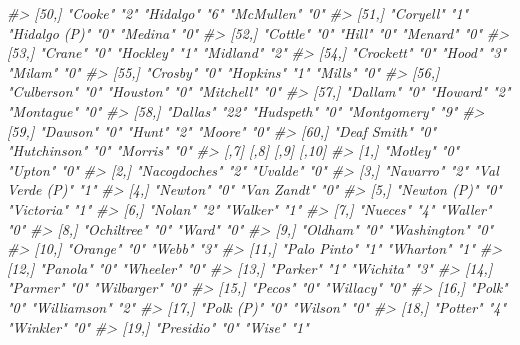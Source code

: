 \documentclass[
]{krantz}
\makeatletter
\newenvironment{Shaded}{\begin{snugshade}}{\end{snugshade}}
\newcommand{\CommentTok}[1]{\textcolor[rgb]{0.37,0.37,0.37}{\textit{#1}}}
\newenvironment{kframe}{%
\medskip{}
\setlength{\fboxsep}{.8em}
 \def\at@end@of@kframe{}%
 \ifinner\ifhmode%
  \def\at@end@of@kframe{\end{minipage}}%
  \begin{minipage}{\columnwidth}%
 \fi\fi%
 \def\FrameCommand##1{\hskip\@totalleftmargin \hskip-\fboxsep
 \colorbox{shadecolor}{##1}\hskip-\fboxsep
     \hskip-\linewidth \hskip-\@totalleftmargin \hskip\columnwidth}%
 \MakeFramed {\advance\hsize-\width
   \@totalleftmargin\z@ \linewidth\hsize
   \@setminipage}}%
 {\par\unskip\endMakeFramed%
 \at@end@of@kframe}
\renewenvironment{Shaded}{\begin{kframe}}{\end{kframe}}
\makeatother
\begin{document}
\begin{Shaded}
\begin{Highlighting}[]
\CommentTok{\#\textgreater{} [50,] "Cooke"         "2"  "Hidalgo"     "6"  "McMullen"      "0" }
\CommentTok{\#\textgreater{} [51,] "Coryell"       "1"  "Hidalgo (P)" "0"  "Medina"        "0" }
\CommentTok{\#\textgreater{} [52,] "Cottle"        "0"  "Hill"        "0"  "Menard"        "0" }
\CommentTok{\#\textgreater{} [53,] "Crane"         "0"  "Hockley"     "1"  "Midland"       "2" }
\CommentTok{\#\textgreater{} [54,] "Crockett"      "0"  "Hood"        "3"  "Milam"         "0" }
\CommentTok{\#\textgreater{} [55,] "Crosby"        "0"  "Hopkins"     "1"  "Mills"         "0" }
\CommentTok{\#\textgreater{} [56,] "Culberson"     "0"  "Houston"     "0"  "Mitchell"      "0" }
\CommentTok{\#\textgreater{} [57,] "Dallam"        "0"  "Howard"      "2"  "Montague"      "0" }
\CommentTok{\#\textgreater{} [58,] "Dallas"        "22" "Hudspeth"    "0"  "Montgomery"    "9" }
\CommentTok{\#\textgreater{} [59,] "Dawson"        "0"  "Hunt"        "2"  "Moore"         "0" }
\CommentTok{\#\textgreater{} [60,] "Deaf Smith"    "0"  "Hutchinson"  "0"  "Morris"        "0" }
\CommentTok{\#\textgreater{}       [,7]            [,8] [,9]            [,10]}
\CommentTok{\#\textgreater{}  [1,] "Motley"        "0"  "Upton"         "0"  }
\CommentTok{\#\textgreater{}  [2,] "Nacogdoches"   "2"  "Uvalde"        "0"  }
\CommentTok{\#\textgreater{}  [3,] "Navarro"       "2"  "Val Verde (P)" "1"  }
\CommentTok{\#\textgreater{}  [4,] "Newton"        "0"  "Van Zandt"     "0"  }
\CommentTok{\#\textgreater{}  [5,] "Newton (P)"    "0"  "Victoria"      "1"  }
\CommentTok{\#\textgreater{}  [6,] "Nolan"         "2"  "Walker"        "1"  }
\CommentTok{\#\textgreater{}  [7,] "Nueces"        "4"  "Waller"        "0"  }
\CommentTok{\#\textgreater{}  [8,] "Ochiltree"     "0"  "Ward"          "0"  }
\CommentTok{\#\textgreater{}  [9,] "Oldham"        "0"  "Washington"    "0"  }
\CommentTok{\#\textgreater{} [10,] "Orange"        "0"  "Webb"          "3"  }
\CommentTok{\#\textgreater{} [11,] "Palo Pinto"    "1"  "Wharton"       "1"  }
\CommentTok{\#\textgreater{} [12,] "Panola"        "0"  "Wheeler"       "0"  }
\CommentTok{\#\textgreater{} [13,] "Parker"        "1"  "Wichita"       "3"  }
\CommentTok{\#\textgreater{} [14,] "Parmer"        "0"  "Wilbarger"     "0"  }
\CommentTok{\#\textgreater{} [15,] "Pecos"         "0"  "Willacy"       "0"  }
\CommentTok{\#\textgreater{} [16,] "Polk"          "0"  "Williamson"    "2"  }
\CommentTok{\#\textgreater{} [17,] "Polk (P)"      "0"  "Wilson"        "0"  }
\CommentTok{\#\textgreater{} [18,] "Potter"        "4"  "Winkler"       "0"  }
\CommentTok{\#\textgreater{} [19,] "Presidio"      "0"  "Wise"          "1"  }

\end{Highlighting}
\end{Shaded}
\end{document}
